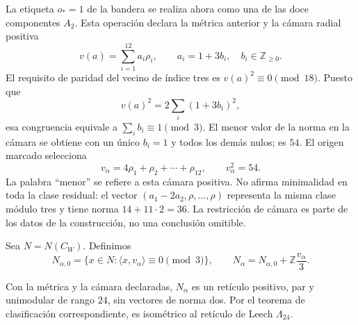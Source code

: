 

La etiqueta $o_*=1$ de la bandera se realiza ahora como una de las
doce componentes $A_2$. Esta operación declara la métrica anterior y
la cámara radial positiva
\[
 v(a)=\sum_{i=1}^{12}a_i\rho_i,
 \qquad a_i=1+3b_i,\quad b_i\in\mathbb Z_{\geq0}.
\]
El requisito de paridad del vecino de índice tres es
$v(a)^2\equiv0\pmod{18}$. Puesto que
\[
 v(a)^2=2\sum_i(1+3b_i)^2,
\]
esa congruencia equivale a $\sum_i b_i\equiv1\pmod3$. El menor
valor de la norma en la cámara se obtiene con un único $b_i=1$ y
todos los demás nulos; es $54$. El origen marcado selecciona
\begin{equation}
 v_\alpha=4\rho_1+\rho_2+\cdots+\rho_{12},
 \qquad v_\alpha^2=54.
 \label{x_reciprocidad:exc:vector}
\end{equation}
La palabra ``menor'' se refiere a esta cámara positiva. No afirma
minimalidad en toda la clase residual: el vector
$(a_1-2a_2,\rho,\ldots,\rho)$ representa la misma clase módulo tres
y tiene norma $14+11\cdot2=36$. La restricción de cámara es parte
de los datos de la construcción, no una conclusión omitible.

Sea $N=N(C_W)$. Definimos
\begin{equation}
 N_{\alpha,0}=\{x\in N:\langle x,v_\alpha\rangle\equiv0\pmod3\},
 \qquad
 N_\alpha=N_{\alpha,0}+\mathbb Z\frac{v_\alpha}{3}.
 \label{x_reciprocidad:exc:vecino}
\end{equation}

\begin{theorem}
\label{x_reciprocidad:exc:teorema-leech}
Con la métrica y la cámara declaradas, $N_\alpha$ es un retículo
positivo, par y unimodular de rango $24$, sin vectores de norma dos.
Por el teorema de clasificación correspondiente, es isométrico al
retículo de Leech $\Lambda_{24}$.
\end{theorem}

